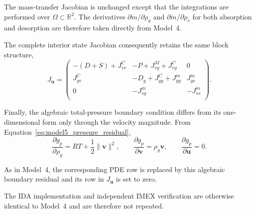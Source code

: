 The mass-transfer Jacobian is unchanged except that the integrations are performed over $\Omega\subset\mathbb R^2$. The derivatives $\partial\dot m/\partial\rho_g$ and $\partial\dot m/\partial\rho_s$ for both absorption and desorption are therefore taken directly from Model~4.

The complete interior state Jacobian consequently retains the same block structure,
\begin{equation}\label{eq:model5_Ju}
J_{\mathbf u}=
\begin{pmatrix}
-(D+S)+J_{vv}^{C}&-P+J_{vg}^{M}+J_{vg}^{C}&0\\
J_{gv}^{C}&-D_g+J_{gg}^{C}+J_{gg}^{\dot m}&J_{gs}^{\dot m}\\
0&-J_{sg}^{\dot m}&-J_{ss}^{\dot m}\\
\end{pmatrix}.
\end{equation}

Finally, the algebraic total-pressure boundary condition differs from its one-dimensional form only through the velocity magnitude. From Equation~\eqref{eq:model5_pressure_residual},
\begin{equation}
\frac{\partial g_p}{\partial\rho_g}
=RT+\frac{1}{2}\lVert\mathbf v\rVert^2,\qquad
\frac{\partial g_p}{\partial\mathbf v}
=\rho_g\mathbf v,\qquad
\frac{\partial g_p}{\partial\dot{\mathbf u}}=0.
\end{equation}

As in Model~4, the corresponding PDE row is replaced by this algebraic boundary residual and its row in $J_{\dot{\mathbf u}}$ is set to zero.

The IDA implementation and independent IMEX verification are otherwise identical to Model~4 and are therefore not repeated.
